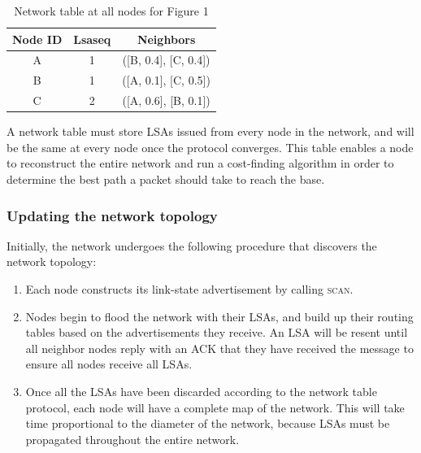 \documentclass[letterpaper]{article}
\begin{document}
\begin{table}[ht]
\caption{Network table at all nodes for Figure 1} %
\centering %
\begin{tabular}{c c c} %
\hline
\hline %
Node ID & Lsaseq & Neighbors  \\[0.5ex] %
\hline %
A & 1 & ([B, 0.4], [C, 0.4])\\
B & 1 & ([A, 0.1], [C, 0.5])\\
C & 2 & ([A, 0.6], [B, 0.1])\\ [1ex]
\hline
\end{tabular}
\label{table:nonlin}
\end{table}


\noindent A network table must store LSAs issued from every node in the network, and will be the same
at every node once the protocol converges. This table enables a node to reconstruct the entire network
and run a cost-finding algorithm in order to determine the best path a packet should take to reach the
base.
\\

\subsubsection{Updating the network topology}

\noindent Initially, the network undergoes the following procedure that discovers the network topology:

\begin{enumerate}
  \item Each node constructs its link-state advertisement by calling \textsc{scan}. 
  \item Nodes begin to flood the network with their LSAs, and build up their routing tables based on
  the advertisements they receive. An LSA will be resent until all neighbor nodes reply with an ACK
  that they have received the message to ensure all nodes receive all LSAs.
  \item Once all the LSAs have been discarded according to the network table protocol, each node will have
  a complete map of the network. This will take time proportional to the diameter of the network, because
  LSAs must be propagated throughout the entire network.
\end{enumerate}
\end{document}
